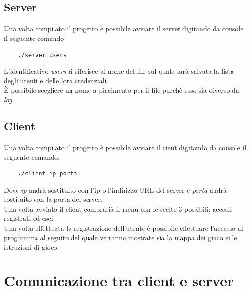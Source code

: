 \documentclass[a4paper]{article}
\begin{document}
\subsection{Server}
\paragraph{}
Una volta compilato il progetto è possibile avviare il server digitando da console il seguente comando
\begin{verbatim}
    ./server users
\end{verbatim}
L'identificativo \textit{users} ri riferisce al nome del file sul quale sarà salvata la lista degli utenti e delle loro credenziali.\\
È possibile scegliere un nome a piacimento per il file purchè esso sia diverso da \textit{log}.
\subsection{Client}
\paragraph{}
Una volta compilato il progetto è possibile avviare il cient digitando da console il seguente comando:
\begin{verbatim}
    ./client ip porta
\end{verbatim}
Dove \textit{ip} andrà sostituito con l'ip o l'indirizzo URL del server e \textit{porta} andrà sostituito con la porta del server.\\
Una volta avviato il client comprarià il menu con le scelte 3 possibili: accedi, registrati ed esci.\\
Una volta effettuata la registrazione dell'utente è possibile effettuare l'accesso al programma al seguito del quale verranno mostrate sia la mappa dei gioco si le istruzioni di gioco.
\pagebreak
\section{Comunicazione tra client e server}
\end{document}
